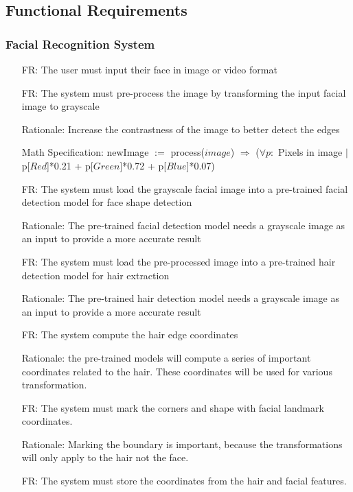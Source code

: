 \documentclass[12pt]{article}
\newcounter{reqnum} %
\newcounter{frreqnum} %
\begin{document}
\subsection{Functional Requirements }
\subsubsection{Facial Recognition System}
    \begin{itemize}
        \item[FR\refstepcounter{frreqnum}\thefrreqnum \label{R_Inputs}:] The user must input their face in image or video format
        \item[FR\refstepcounter{frreqnum}\thefrreqnum \label{R_Inputs}:] The system must pre-process the image by transforming the input facial image to grayscale
        \item[] Rationale: Increase the contrastness of the image to better detect the edges
        \item[] Math Specification: newImage $:=$ process($image$) $\Rightarrow$ ($\forall p :$ Pixels in image $|$ p[$Red$]*0.21 + p[$Green$]*0.72 + p[$Blue$]*0.07)
        \item[FR\refstepcounter{frreqnum}\thefrreqnum \label{R_Inputs}:] The system must load the grayscale facial image into a pre-trained facial detection model for face shape detection
        \item[] Rationale: The pre-trained facial detection model needs a grayscale image as an input to provide a more accurate result
        \item[FR\refstepcounter{frreqnum}\thefrreqnum \label{R_Inputs}:] The system must load the pre-processed image into a pre-trained hair detection model for hair extraction
        \item[] Rationale: The pre-trained hair detection model needs a grayscale image as an input to provide a more accurate result
        \item[FR\refstepcounter{frreqnum}\thefrreqnum \label{R_Inputs}:] The system compute the hair edge coordinates
        \item[] Rationale: the pre-trained models will compute a series of important coordinates related to the hair. These coordinates will be used for various transformation.
        \item[FR\refstepcounter{frreqnum}\thefrreqnum \label{R_Inputs}:] The system must mark the corners and shape with facial landmark coordinates.
        \item[] Rationale: Marking the boundary is important, because the transformations will only apply to the hair not the face.
        \item[FR\refstepcounter{frreqnum}\thefrreqnum \label{R_Inputs}:] The system must store the coordinates from the hair and facial features.
    \end{itemize}
\end{document}
